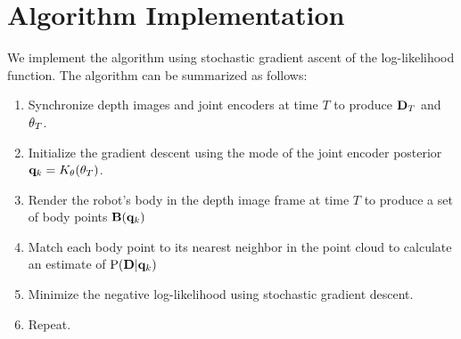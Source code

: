 \section{Algorithm Implementation}
We implement the algorithm using stochastic gradient ascent of the log-likelihood function. The algorithm can be summarized as follows:

\begin{enumerate}
  \item Synchronize depth images and joint encoders at time $T$ to produce $\mathbf{D}_T$ and $\theta_T$.
  \item Initialize the gradient descent using the mode of the joint encoder posterior $\mathbf{q}_{k} = K_\theta(\theta_T)$.
  \item Render the robot's body in the depth image frame at time $T$ to produce a set of body points $\mathbf{B}(\mathbf{q}_{k})$
  \item Match each body point to its nearest neighbor in the point cloud to calculate an estimate of $\text{P}(\mathbf{D} | \mathbf{q}_{k})$
  \item Minimize the negative log-likelihood using stochastic gradient descent.
  \item Repeat.
\end{enumerate}

